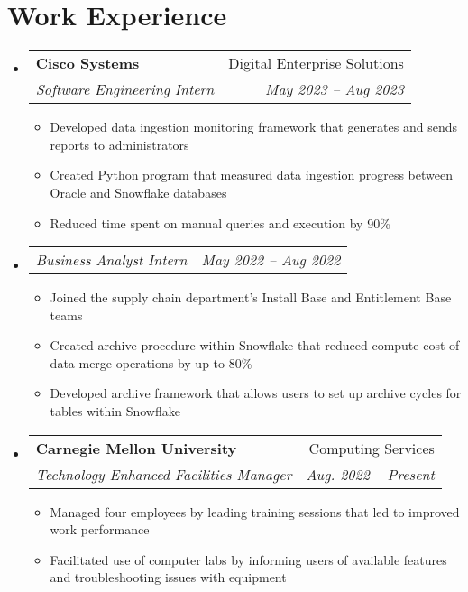 \documentclass[letterpaper,11pt]{article}
\makeatletter
\newcommand{\resumeItem}[1]{
  \item\small{
    {#1 \vspace{-2pt}}
  }
}
\newcommand{\resumeSubheading}[4]{
  \vspace{-2pt}\item
    \begin{tabular*}{0.97\textwidth}[t]{l@{\extracolsep{\fill}}r}
      \textbf{#1} & #2 \\
      \textit{\small#3} & \textit{\small #4} \\
    \end{tabular*}\vspace{-7pt}
}
\newcommand{\resumeSubSubheading}[2]{
    \item
    \begin{tabular*}{0.97\textwidth}{l@{\extracolsep{\fill}}r}
      \textit{\small#1} & \textit{\small #2} \\
    \end{tabular*}\vspace{-7pt}
}
\newcommand{\resumeSubHeadingListStart}{\begin{itemize}[leftmargin=0.15in, label={}]}
\newcommand{\resumeSubHeadingListEnd}{\end{itemize}}
\newcommand{\resumeItemListStart}{\begin{itemize}}
\newcommand{\resumeItemListEnd}{\end{itemize}\vspace{-5pt}}
\makeatother
\begin{document}
\section{Work Experience}
    \resumeSubHeadingListStart
        \resumeSubheading
        {Cisco Systems}{Digital Enterprise Solutions}
        {Software Engineering Intern}{May 2023 -- Aug 2023}
            \resumeItemListStart
                \resumeItem{Developed data ingestion monitoring framework that generates and sends reports to administrators}
                \resumeItem{Created Python program that measured data ingestion progress between Oracle and Snowflake databases}
                \resumeItem{Reduced time spent on manual queries and execution by 90\%}
            \resumeItemListEnd
        \resumeSubSubheading
        {Business Analyst Intern}{May 2022 -- Aug 2022}
            \resumeItemListStart
                \resumeItem{Joined the supply chain department's Install Base and Entitlement Base teams}
                \resumeItem{Created archive procedure within Snowflake that reduced compute cost of data merge operations by up to 80\%}
                \resumeItem{Developed archive framework that allows users to set up archive cycles for tables within Snowflake}
            \resumeItemListEnd
        \resumeSubheading
        {Carnegie Mellon University}{Computing Services}
        {Technology Enhanced Facilities Manager}{Aug. 2022 -- Present}
            \resumeItemListStart
                \resumeItem{Managed four employees by leading training sessions that led to improved work performance}
                \resumeItem{Facilitated use of computer labs by informing users of available features and troubleshooting issues with equipment}
            \resumeItemListEnd
    \resumeSubHeadingListEnd

\end{document}
